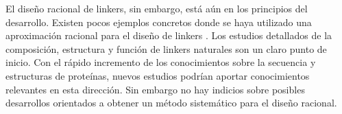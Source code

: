 El diseño racional de linkers, sin embargo, está aún en los principios del desarrollo. 
Existen pocos ejemplos concretos donde se haya utilizado una aproximación racional para el diseño de linkers \cite{arai2001design,arai2004conformations}.
Los estudios detallados de la composición, estructura y función de linkers naturales son un claro punto de inicio.
Con el rápido incremento de los conocimientos sobre la secuencia y estructuras de proteínas, nuevos estudios podrían aportar conocimientos relevantes en esta dirección.
Sin embargo no hay indicios sobre posibles desarrollos orientados a obtener un método sistemático para el diseño racional.  





